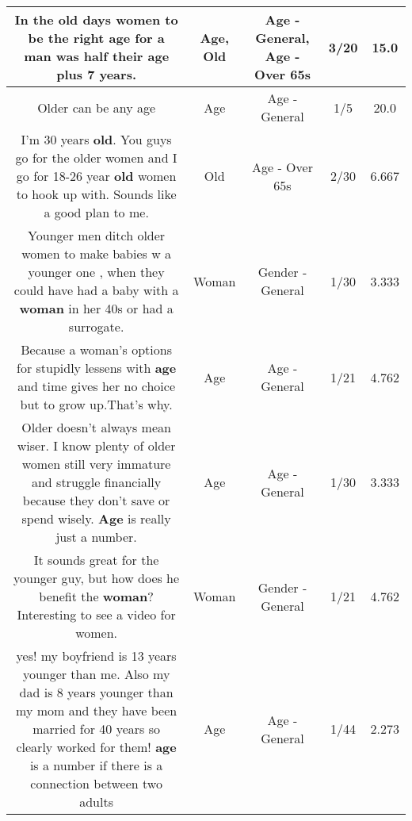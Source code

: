 \documentclass[11pt]{article}
\newlength\mylength
\begin{document}
\begin{center}
\begin{longtable}{|C{.65\mylength}|C{.30\mylength}|C{.12\mylength}|C{.12\mylength}|C{.12\mylength}|}
  \small In the \textbf{old} days women to be the right \textbf{age} for a man was half their \textbf{age} plus 7 years.\normalsize   & Age, Old & Age - General, Age - Over 65s & 3/20 & 15.0 \\  \hline
  \small Older can be any age\normalsize   & Age & Age - General & 1/5 & 20.0 \\  \hline
  \small I'm 30 years \textbf{old}. You guys go for the older women and I go for 18-26 year \textbf{old} women to hook up with. Sounds like a good plan to me.\normalsize   & Old & Age - Over 65s & 2/30 & 6.667 \\  \hline
  \small Younger men ditch older women to make babies w a younger one , when they could have had a baby with a \textbf{woman} in her 40s or had a surrogate.\normalsize   & Woman & Gender - General & 1/30 & 3.333 \\  \hline
  \small Because a woman's options for stupidly lessens with \textbf{age} and time gives her no choice but to grow up.That's why.\normalsize   & Age & Age - General & 1/21 & 4.762 \\  \hline
  \small Older doesn't always mean wiser. I know plenty of older women still very immature and struggle financially because they don't save or spend wisely. \textbf{Age} is really just a number.\normalsize   & Age & Age - General & 1/30 & 3.333 \\  \hline
  \small It sounds great for the younger guy, but how does he benefit the \textbf{woman}? Interesting to see a video for women.\normalsize   & Woman & Gender - General & 1/21 & 4.762 \\  \hline
  \small yes! my boyfriend is 13 years younger than me. Also my dad is 8 years younger than my mom and they have been married for 40 years so clearly worked for them! \textbf{age} is a number if there is a connection between two adults\normalsize   & Age & Age - General & 1/44 & 2.273 \\  \hline

\end{longtable}
\end{center}
\end{document}
